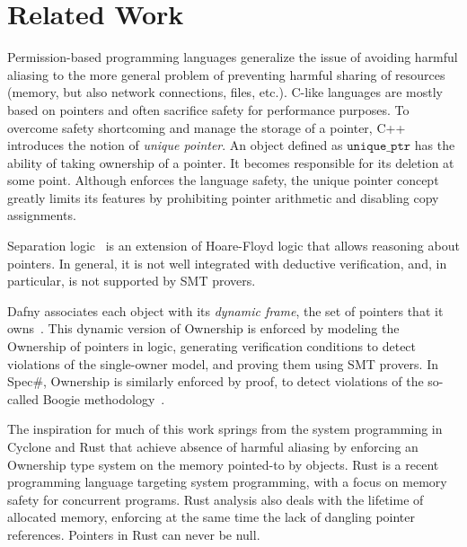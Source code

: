 \documentclass{llncs}
\newcommand\var[1]{\ensuremath{\mathtt{#1}}}
\begin{document}
\section{Related Work}


Permission-based programming languages generalize the issue of avoiding harmful aliasing to the more general problem of preventing harmful sharing of resources
(memory, but also network connections, files, etc.). C-like languages are mostly based on pointers and often sacrifice safety for performance purposes.
To overcome safety shortcoming and manage the storage of a pointer, C++ introduces the notion of \textit{unique pointer}. An object defined as \var{unique\_ptr}
has the ability of taking ownership of a pointer. It becomes responsible for its deletion at some point. Although enforces the language safety, the unique
pointer concept greatly limits its features by prohibiting pointer arithmetic and disabling copy assignments.

Separation logic~\cite{Reynolds02} is an extension of Hoare-Floyd logic that allows reasoning about pointers. In general, it is not well integrated with deductive
verification, and, in particular, is not supported by SMT provers.


Dafny associates each object with its \emph{dynamic frame}, the set of pointers that it owns~\cite{Leino10}. This dynamic version of Ownership is
enforced by modeling the Ownership of pointers in logic, generating verification conditions to detect violations of the single-owner model, and proving
them using SMT provers. In Spec\#, Ownership is similarly enforced by proof, to detect violations of the so-called Boogie methodology~\cite{Boogie}.

The inspiration for much of this work springs from the system programming in Cyclone \cite{Grossman2002} and Rust \cite{Balasubramanian17} that achieve absence of
harmful aliasing by enforcing an Ownership type system on the memory pointed-to by objects. Rust is a recent programming language targeting system
programming, with a focus on memory safety for concurrent programs.
Rust analysis also deals with the lifetime of allocated memory, enforcing
at the same time the lack of dangling pointer references. Pointers in Rust can never be null.
\end{document}
